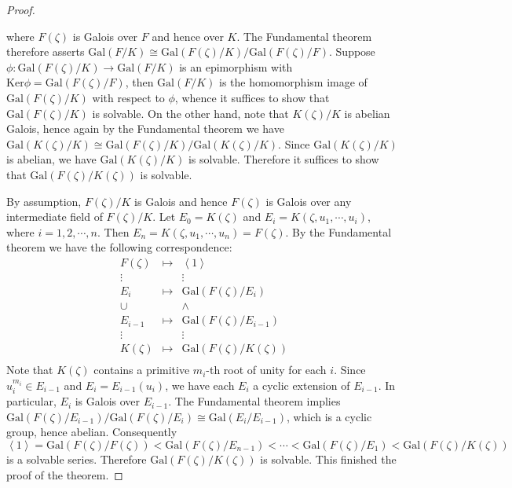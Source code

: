 \begin{proof}
\begin{center}
\begin{tikzpicture}[x=0.75pt,y=0.75pt,yscale=-1,xscale=1]
\end{tikzpicture}
\end{center}
where $F(\zeta)$ is Galois over $F$ and hence over $K$. The Fundamental theorem therefore asserts $\mathrm{Gal}(F/K)\cong\mathrm{Gal}(F(\zeta)/K)/\mathrm{Gal}(F(\zeta)/F)$. Suppose $\phi:\mathrm{Gal}(F(\zeta)/K)\to\mathrm{Gal}(F/K)$ is an epimorphism with $\mathrm{Ker}\phi=\mathrm{Gal}(F(\zeta)/F)$, then $\mathrm{Gal}(F/K)$ is the homomorphism image of $\mathrm{Gal}(F(\zeta)/K)$ with respect to $\phi$, whence it suffices to show that $\mathrm{Gal}(F(\zeta)/K)$ is solvable. On the other hand, note that $K(\zeta)/K$ is abelian Galois, hence again by the Fundamental theorem we have $\mathrm{Gal}(K(\zeta)/K)\cong\mathrm{Gal}(F(\zeta)/K)/\mathrm{Gal}(K(\zeta)/K)$. Since $\mathrm{Gal}(K(\zeta)/K)$ is abelian, we have $\mathrm{Gal}(K(\zeta)/K)$ is solvable. Therefore it suffices to show that $\mathrm{Gal}(F(\zeta)/K(\zeta))$ is solvable.\par
By assumption, $F(\zeta)/K$ is Galois and hence $F(\zeta)$ is Galois over any intermediate field of $F(\zeta)/K$. Let $E_0=K(\zeta)$ and $E_i=K(\zeta,u_1,\cdots,u_i)$, where $i=1,2,\cdots,n$. Then $E_n=K(\zeta,u_1,\cdots,u_n)=F(\zeta)$. By the Fundamental theorem we have the following correspondence: 
$$
\begin{matrix}
	F\left( \zeta \right)&		\mapsto&		\left< 1 \right>\\
	\vdots&		&		\vdots\\
	E_i&		\mapsto&		\mathrm{Gal}\left( F\left( \zeta \right) /E_i \right)\\
	\cup&		&		\land\\
	E_{i-1}&		\mapsto&		\mathrm{Gal}\left( F\left( \zeta \right) /E_{i-1} \right)\\
	\vdots&		&		\vdots\\
	K\left( \zeta \right)&		\mapsto&		\mathrm{Gal}\left( F\left( \zeta \right) /K\left( \zeta \right) \right)\\
\end{matrix}
$$
Note that $K(\zeta)$ contains a primitive $m_i$-th root of unity for each $i$. Since $u_i^{m_i}\in E_{i-1}$ and $E_i=E_{i-1}(u_i)$, we have each $E_i$ a cyclic extension of $E_{i-1}$. In particular, $E_i$ is Galois over $E_{i-1}$. The Fundamental theorem implies $\mathrm{Gal}(F(\zeta)/E_{i-1})/\mathrm{Gal}(F(\zeta)/E_i)\cong\mathrm{Gal}(E_i/E_{i-1})$, which is a cyclic group, hence abelian. Consequently 
$$
\left< 1 \right> =\mathrm{Gal}\left( F\left( \zeta \right) /F\left( \zeta \right) \right) <\mathrm{Gal}\left( F\left( \zeta \right) /E_{n-1} \right) <\cdots <\mathrm{Gal}\left( F\left( \zeta \right) /E_1 \right) <\mathrm{Gal}\left( F\left( \zeta \right) /K\left( \zeta \right) \right) 
$$
is a solvable series. Therefore $\mathrm{Gal}(F(\zeta)/K(\zeta))$ is solvable. This finished the proof of the theorem.
\end{proof}
